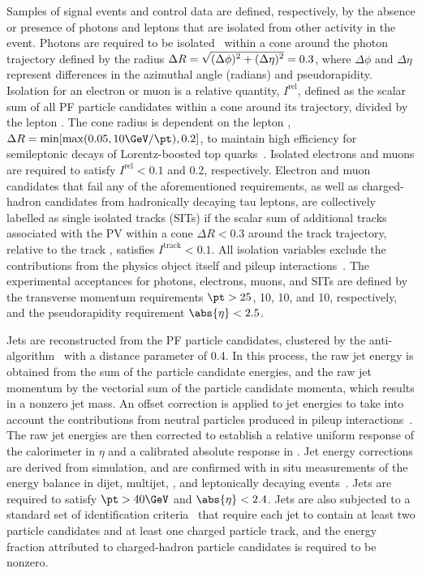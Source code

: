 Samples of signal events and control data are defined, respectively,
by the absence or presence of photons and leptons that are isolated
from other activity in the event. Photons are required to be
isolated~\cite{Khachatryan:2015iwa} within a cone around the photon
trajectory defined by the radius ${\Delta}R =
\sqrt{\smash[b]{(\Delta\phi)^2 + (\Delta\eta)^2}} = 0.3$, where
$\Delta\phi$ and $\Delta\eta$ represent differences in the azimuthal
angle (radians) and pseudorapidity. Isolation for an electron or muon
is a relative quantity, $I^\text{rel}$, defined as the scalar \pt sum
of all PF particle candidates within a cone around its trajectory,
divided by the lepton \pt. The cone radius is dependent on the lepton
\pt, ${\Delta}R = \min [ \max( 0.05, 10\GeV / \pt ), 0.2 ]$, to
maintain high efficiency for semileptonic decays of Lorentz-boosted
top quarks~\cite{Rehermann:2010vq}. Isolated electrons and muons are
required to satisfy $I^\text{rel} < 0.1$ and 0.2, respectively.
Electron and muon candidates that fail any of the aforementioned
requirements, as well as charged-hadron candidates from hadronically
decaying tau leptons, are collectively labelled as single isolated
tracks (SITs) if the scalar \pt sum of additional tracks associated
with the PV within a cone ${\Delta}R < 0.3$ around the track
trajectory, relative to the track \pt, satisfies $I^\text{track} <
0.1$. All isolation variables exclude the contributions from the
physics object itself and pileup
interactions~\cite{Khachatryan:2015iwa, Khachatryan:2015hwa,
  Chatrchyan:2012xi}. The experimental acceptances for photons,
electrons, muons, and SITs are defined by the transverse momentum
requirements $\pt > 25$, 10, 10, and 10\GeV, respectively, and the
pseudorapidity requirement $\abs{\eta} < 2.5$.

Jets are reconstructed from the PF particle candidates, clustered by
the anti-\kt algorithm~\cite{Cacciari:2008gp, Cacciari:2011ma} with a
distance parameter of 0.4. In this process, the raw jet energy is
obtained from the sum of the particle candidate energies, and the raw
jet momentum by the vectorial sum of the particle candidate momenta,
which results in a nonzero jet mass. An offset correction is applied
to jet energies to take into account the contributions from neutral
particles produced in pileup interactions~\cite{Cacciari:2007fd,
  CMS-PAS-JME-14-001}. The raw jet energies are then corrected to
establish a relative uniform response of the calorimeter in $\eta$ and
a calibrated absolute response in \pt. Jet energy corrections are
derived from simulation, and are confirmed with in situ measurements
of the energy balance in dijet, multijet, \gj, and leptonically
decaying \zj events~\cite{Khachatryan:2016kdb}. Jets are required to
satisfy $\pt > 40\GeV$ and $\abs{\eta} < 2.4$. Jets are also subjected
to a standard set of identification criteria~\cite{2011JInst611002C}
that require each jet to contain at least two particle candidates and
at least one charged particle track, and the energy fraction \fh
attributed to charged-hadron particle candidates is required to be
nonzero.

